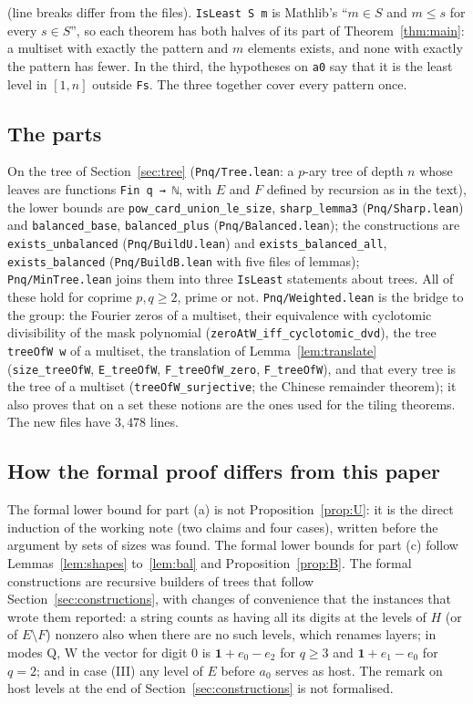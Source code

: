 \documentclass[11pt,a4paper]{amsart}
\theoremstyle{definition}
\theoremstyle{remark}
\newcommand{\one}{\mathbf{1}}
\newcommand{\lean}[1]{\texttt{#1}}
\begin{document}
\noindent (line breaks differ from the files). \lean{IsLeast S m} is Mathlib's ``$m\in S$ and $m\le s$ for
every $s\in S$'', so each theorem has both halves of its part of Theorem~\ref{thm:main}: a multiset with exactly
the pattern and $m$ elements exists, and none with exactly the pattern has fewer. In the third, the
hypotheses on \lean{a0} say that it is the least level in $[1,n]$ outside \lean{Fs}. The three together cover
every pattern once.

\subsection*{The parts} \sloppy On the tree of Section~\ref{sec:tree} (\lean{Pnq/Tree.lean}: a $p$-ary tree of depth
$n$ whose leaves are functions \lean{Fin q → ℕ}, with $E$ and $F$ defined by recursion as in the text), the
lower bounds are \lean{pow\_card\_union\_le\_size}, \lean{sharp\_lemma3} (\lean{Pnq/Sharp.lean}) and
\lean{balanced\_base}, \lean{balanced\_plus} (\lean{Pnq/Balanced.lean}); the constructions are
\lean{exists\_unbalanced} (\lean{Pnq/BuildU.lean}) and \lean{exists\_balanced\_all}, \lean{exists\_balanced}
(\lean{Pnq/BuildB.lean} with five files of lemmas); \lean{Pnq/MinTree.lean} joins them into three
\lean{IsLeast} statements about trees. All of these hold for coprime $p,q\ge2$, prime or not.
\lean{Pnq/Weighted.lean} is the bridge to the group: the Fourier zeros of a multiset, their equivalence with
cyclotomic divisibility of the mask polynomial (\lean{zeroAtW\_iff\_cyclotomic\_dvd}), the tree
\lean{treeOfW w} of a multiset, the translation of Lemma~\ref{lem:translate} (\lean{size\_treeOfW},
\lean{E\_treeOfW}, \lean{F\_treeOfW\_zero}, \lean{F\_treeOfW}), and that every tree is the tree of a
multiset (\lean{treeOfW\_surjective}; the Chinese remainder theorem); it also proves that on a set these
notions are the ones used for the tiling theorems. The new files have $3{,}478$ lines.

\subsection*{How the formal proof differs from this paper} The formal lower bound for part (a) is not
Proposition~\ref{prop:U}: it is the direct induction of the working note (two claims and four cases), written
before the argument by sets of sizes was found. The formal lower bounds for part (c) follow
Lemmas~\ref{lem:shapes} to~\ref{lem:bal} and Proposition~\ref{prop:B}. The formal constructions are recursive
builders of trees that follow Section~\ref{sec:constructions}, with changes of convenience that the instances
that wrote them reported: a string counts as having all its digits at the levels of $H$ (or of
$E\setminus F$) nonzero also when there are no such levels, which renames layers; in modes $\mathrm Q$,
$\mathrm W$ the vector for digit $0$ is $\one+e_0-e_2$ for $q\ge3$ and $\one+e_1-e_0$ for $q=2$; and in case
(III) any level of $E$ before $a_0$ serves as host. The remark on host levels at the end of
Section~\ref{sec:constructions} is not formalised.
\end{document}

